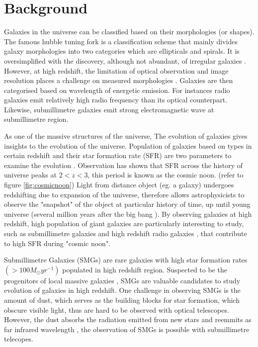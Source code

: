 \documentclass{article}
\begin{document}
\section{Background}
Galaxies in the universe can be classified based on their morphologies (or shapes). The famous hubble tuning fork is a classification scheme that mainly divides galaxy morphologies into two categories which are ellipticals and spirals. It is oversimplified with the discovery, although not abundant, of irregular galaxies \parencite{Gallagher1984}. However, at high redshift, the limitation of optical observation and image resolution places a challenge on measured morphologies \parencite{Rouan2008}. Galaxies are then categorised based on wavelength of energetic emission. For instances radio galaxies emit relatively high radio frequency than its optical counterpart. Likewise, submillimetre galaxies emit strong electromagnetic wave at submillimetre region.
\medskip

\noindent As one of the massive structures of the universe, The evolution of galaxies gives insights to the evolution
of the universe. Population of galaxies based on types in certain redshift and their star formation rate (SFR) are two parameters to examine the evolution \cite{Martin2005}. Observation has shown that SFR across the history of universe peaks at $2 < z < 3$, this period is known as the cosmic noon. (refer to figure \ref{fig:cosmicnoon}) Light from distance object (eg. a galaxy) undergoes redshifting due to expansion of the universe, therefore allows astrophysicists to observe the "snapshot" of the object at particular history of time, up until young universe (several million years after the big bang \cite{Jiang2021}).  By observing galaxies at high redshift, high population of giant galaxies are particularly interesting to study, such as submillimetre galaxies and high redshift radio galaxies \cite{Singh2014} \cite{Chapman2005},  that contribute to high SFR during "cosmic noon".
\medskip

\noindent Submillimetre Galaxies (SMGs) are rare galaxies with high star formation rates $(>100M_\odot yr^{-1})$ \parencite{DaCunha2021} populated in high redshift region. Suspected to be the progenitors of local massive galaxies \parencite{Casey2014}, SMGs are valuable candidates to study evolution of galaxies in high redshift. One challenge in observing SMGs is the amount of dust, which serves as the building blocks for star formation, which obscure visible light, thus are hard to be observed with optical telescopes. However, the dust absorbs the radiation emitted from new stars and reemmits as far infrared wavelength \parencite{Casey2014}, the observation of SMGs is possible with submillimetre telecopes. 
\medskip
\end{document}
